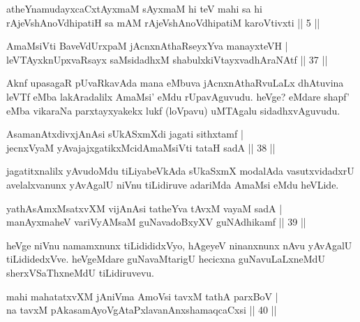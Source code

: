 \begin{kandikeshl}
atheYnamudayxcaCxtAyxmaM sAyxmaM hi teV mahi sa hi rAjeVshAnoV\s dhipatiH sa mAM rAjeVshAnoV\s dhipatiM karoVtivxti || 5 ||
\end{kandikeshl}

\begin{shl}
AmaMsiVti BaveVdUrxpaM jAcnxnAthaRseyxYva manayxteVH | \\
leVTAyxknUpxvaRsayx saMsidadhxM shabulxkiVtayxvadhAraNAtf \hfill|| 37 || 
\end{shl}

\begin{artha}
Aknf upasagaR pUvaRkavAda mana eMbuva jAcnxnAthaRvuLaLx dhAtuvina leVTf eMba lakAradalilx AmaMsi' eMdu rUpavAguvudu. heVge? eMdare shapf' eMba vikaraNa parxtayxyakekx lukf (loVpavu) uMTAgalu sidadhxvAguvudu.
\end{artha}


\begin{shl}
AsamanAtxdivxjAnAsi sUkASxmXdi jagati sithxtamf | \\
jecnxVyaM yAvajajxgatikxMcidAmaMsiVti tataH sadA \hfill|| 38 || 
\end{shl}

\begin{artha}
jagatitxnalilx yAvudoMdu tiLiyabeVkAda sUkaSxmX modalAda vasutxvidadxrU avelalxvanunx yAvAgalU niVnu tiLidiruve adariMda AmaMsi eMdu heVLide.
\end{artha}


\begin{shl}
yathA\s sAmxMsatxvXM vijAnAsi tatheYva tAvxM vayaM sadA | \\
manAyxmaheV variVyAMsaM guNavadoBxyXV guNAdhikamf \hfill|| 39 || 
\end{shl}

\begin{artha}
heVge niVnu namamxnunx tiLidididxVyo, hAgeyeV ninanxnunx nAvu yAvAgalU tiLididedxVve. heVgeMdare guNavaMtarigU hecicxna guNavuLaLxneMdU sherxVSaThxneMdU tiLidiruvevu.
\end{artha}


\begin{shl}
mahi mahatatxvXM jAniVma AmoV\s si tavxM tathA parxBoV | \\
na tavxM pAkasamAyoVgAtaPxlavanAnxshamaqcaCxsi \hfill|| 40 || 
\end{shl}

